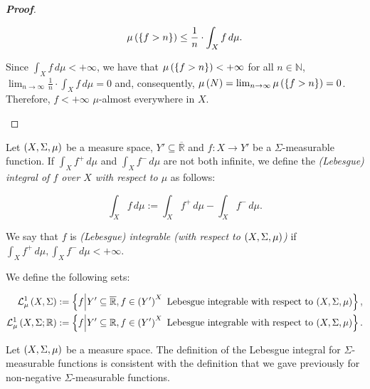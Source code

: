 \begin{proposition}
\begin{proof}[\rm\textbf{Proof}]
\begin{enumerate}
      \begin{equation}
        \mu\left(\left\{f>n\right\}\right)\leq\frac{1}{n}\cdot\int_{X}{f\,d\mu}.
      \end{equation}

      Since $\int_{X}{f\,d\mu}<+\infty$, we have that $\mu\left(\left\{f>n\right\}\right)<+\infty$ for all $n\in\mathbb{N}$, $\lim_{n\to\infty}{\frac{1}{n}\cdot\int_{X}{f\,d\mu}}=0$ and, consequently, $\mu\left(N\right)=\lim_{n\to\infty}{\mu\left(\left\{f>n\right\}\right)}=0$. Therefore, $f<+\infty$ $\mu$-almost everywhere in $X$.
    \end{enumerate}
  \end{proof}
\end{proposition}

\begin{definition}
  Let $\left(X,\Sigma,\mu\right)$ be a measure space, $Y'\subseteq\overline{\mathbb{R}}$ and $f:X\rightarrow Y'$ be a $\Sigma$-measurable function. If $\int_{X}{f^+\,d\mu}$ and $\int_{X}{f^-\,d\mu}$ are not both infinite, we define the \emph{(Lebesgue) integral of $f$ over $X$ with respect to $\mu$} as follows:

  \begin{equation}
    \int_{X}{f\,d\mu}:=\int_{X}{f^+\,d\mu}-\int_{X}{f^-\,d\mu}.
  \end{equation}

  We say that $f$ is \emph{(Lebesgue) integrable (with respect to $\left(X,\Sigma,\mu\right)$)} if $\int_{X}{f^+\,d\mu},\int_{X}{f^-\,d\mu}<+\infty$. 
  
  We define the following sets:

  \begin{equation}
    \begin{split}
      \mathcal{L}^1_{\mu}\left(X,\Sigma\right) & :=\left\{f\middle|Y'\subseteq\overline{\mathbb{R}},f\in\left(Y'\right)^{X}\text{ Lebesgue integrable with respect to $\left(X,\Sigma,\mu\right)$}\right\},\\
      \mathcal{L}^1_{\mu}\left(X,\Sigma;\mathbb{R}\right) & :=\left\{f\middle|Y'\subseteq\mathbb{R},f\in\left(Y'\right)^{X}\text{ Lebesgue integrable with respect to $\left(X,\Sigma,\mu\right)$}\right\}.
    \end{split}
  \end{equation}
\end{definition}

\begin{remark}
  Let $\left(X,\Sigma,\mu\right)$ be a measure space. The definition of the Lebesgue integral for $\Sigma$-measurable functions is consistent with the definition that we gave previously for non-negative $\Sigma$-measurable functions.
\end{remark}

